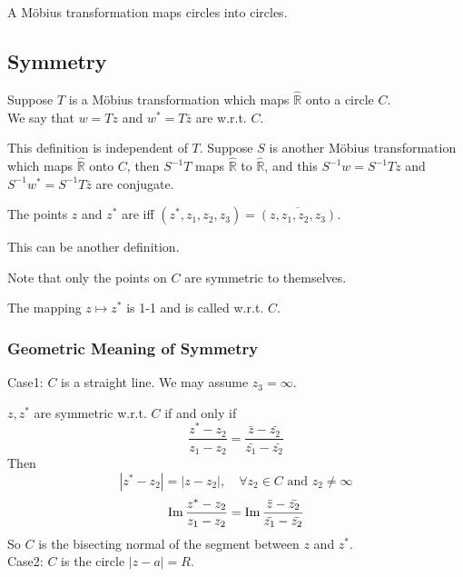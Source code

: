 \begin{theorem}
    A M{\"o}bius transformation maps circles into circles.
\end{theorem}
\subsection{Symmetry}
Suppose  $ T  $ is a M{\"o}bius transformation which maps  $ \hat{\mathbb{R}}  $ onto a circle  $ C $. \\
We say that  $ w=Tz  $ and  $ w^*=T\bar{z} $ are  w.r.t.  $ C $.
\begin{remark}
    This definition is independent of  $ T $. Suppose  $ S  $ is another M{\"o}bius transformation which maps  $ \hat{\mathbb{R}} $ onto  $ C $, then  $ S^{-1}T $ maps  $ \hat{\mathbb{R}} $ to  $ \hat{\mathbb{R}} $, and this  $ S^{-1}w=S^{-1}Tz $ and  $ S^{-1}w^*=S^{-1}T\bar{z} $ are conjugate.       
\end{remark}  
The points  $ z  $ and  $ z^* $ are  iff  $ (z^*,z_1,z_2,z_3)=\overline{(z,z_1,z_2,z_3)} $.

This can be another definition. 

Note that only the points on  $ C  $ are symmetric to themselves.

The mapping  $ z\mapsto z^* $ is 1-1 and is called  w.r.t. $ C $.

\subsubsection{Geometric Meaning of Symmetry} 
Case1:  $ C  $ is a straight line. We may assume  $ z_3=\infty $. 

$ z,z^* $ are symmetric w.r.t.  $ C $ if and only if 
\[\frac{z^*-z_2}{z_1-z_2}=\frac{\bar{z}-\bar{z_2}}{\bar{z_1}-\bar{z_2}}\]
Then 
\[|z^*-z_2|=|z-z_2|,\quad \forall z_2\in C\text{ and }z_2\not=\infty\]
\[\operatorname{Im}\frac{z^*-z_2}{z_1-z_2}=\operatorname{Im}\frac{\bar{z}-\bar{z_2}}{\bar{z_1}-\bar{z_2}}\]   
So  $ C  $ is the bisecting normal of the segment between  $ z  $ and  $ z^
 * $.\\
Case2: $ C  $ is the circle  $ |z-a|=R $.

